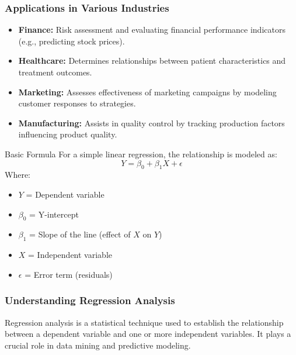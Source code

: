 \documentclass{beamer}
\begin{document}
\begin{frame}[fragile]
    \frametitle{Applications in Various Industries}
    \begin{itemize}
        \item \textbf{Finance:} Risk assessment and evaluating financial performance indicators (e.g., predicting stock prices).
        \item \textbf{Healthcare:} Determines relationships between patient characteristics and treatment outcomes.
        \item \textbf{Marketing:} Assesses effectiveness of marketing campaigns by modeling customer responses to strategies.
        \item \textbf{Manufacturing:} Assists in quality control by tracking production factors influencing product quality.
    \end{itemize}
    
    \begin{block}{Basic Formula}
        For a simple linear regression, the relationship is modeled as:
        \begin{equation}
            Y = \beta_0 + \beta_1X + \epsilon
        \end{equation}
        Where:
        \begin{itemize}
            \item \( Y \) = Dependent variable
            \item \( \beta_0 \) = Y-intercept
            \item \( \beta_1 \) = Slope of the line (effect of \( X \) on \( Y \))
            \item \( X \) = Independent variable
            \item \( \epsilon \) = Error term (residuals)
        \end{itemize}
    \end{block}
\end{frame}

\begin{frame}[fragile]
    \frametitle{Understanding Regression Analysis}
    Regression analysis is a statistical technique used to establish the relationship between a dependent variable and one or more independent variables. It plays a crucial role in data mining and predictive modeling.
\end{frame}
\end{document}
